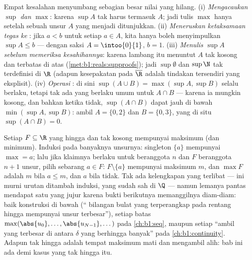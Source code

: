 \begin{remark}
Empat kesalahan menyumbang sebagian besar nilai yang hilang. (i) \emph{Mengacaukan
$\sup$ dan $\max$}: karena $\sup A$ tak harus termasuk $A$; jadi tulis $\max$
hanya setelah sebuah unsur $A$ yang menjadi  ditunjukkan.
(ii) \emph{Meneruskan ketaksamaan tegas ke }: jika $a <
b$ untuk setiap $a \in A$, kita hanya boleh menyimpulkan $\sup A \leq b$ ---
dengan saksi $A = \intoo{0}{1}$, $b = 1$. (iii) \emph{Menulis $\sup A$
sebelum memeriksa kesahihannya}: karena lambang itu menuntut $A$ tak kosong dan
terbatas di atas (\cref{met:b1:reals:supproofs}); jadi $\sup \emptyset$
dan $\sup \N$ tak terdefinisi di $\R$ (adapun kesepakatan pada
$\overline\R$ adalah tindakan tersendiri yang eksplisit). (iv) \emph{Operasi
}: di sini $\sup(A \cup B) = \max(\sup A, \sup B)$ selalu berlaku, tetapi
tak ada yang berlaku umum untuk $A \cap B$ --- karena ia mungkin kosong, dan
bahkan ketika tidak, $\sup(A \cap B)$ dapat jauh di bawah
$\min(\sup A, \sup B)$: ambil $A = \{0, 2\}$ dan $B = \{0, 3\}$,
yang di situ $\sup(A \cap B) = 0$.
\end{remark}

\begin{example}\label{ex:b1:reals:finitemax}
Setiap $F \subseteq \R$ yang hingga dan tak kosong mempunyai maksimum (dan
minimum). Induksi pada banyaknya unsurnya: singleton
$\{a\}$ mempunyai $\max = a$; lalu jika klaimnya berlaku untuk  beranggota $n$
dan $F$ beranggota $n + 1$ unsur, pilih sebarang $a \in F$:  $F
\setminus \{a\}$ mempunyai maksimum $m$, dan $\max F$ adalah $m$ bila $a
\leq m$, dan $a$ bila tidak. Tak ada kelengkapan yang terlibat --- ini murni
urutan ditambah induksi, yang sudah sah di $\Q$ --- namun lemanya
pantas mendapat satu  yang jujur karena bukti berikutnya memanggilnya
diam-diam: baik konstruksi  di bawah (`` bilangan bulat
yang terperangkap pada rentang hingga mempunyai unsur terbesar''), setiap
batas $\max(\abs{u_0}, \dots, \abs{u_{N-1}}, \dots)$ pada
\cref{ch:b1:seq}, maupun setiap ``ambil yang terbesar di antara $\delta$ yang berhingga banyak''
pada \cref{ch:b1:continuity}. Adapun  tak hingga adalah tempat
maksimum mati dan  mengambil alih: bab ini ada demi kasus yang
tak hingga itu.
\end{example}

